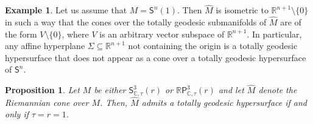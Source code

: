 \documentclass[11pt,a4paper,final]{amsart}
\newcommand{\s}{\mathsf}
\newcommand{\R}{\mathbb{R}}
\newcommand{\C}{\mathbb{C}}
\renewcommand{\hat}{\widehat}
\newtheorem{proposition}[theorem]{Proposition}
\theoremstyle{definition}
\newtheorem{example}[theorem]{Example}
\begin{document}
\begin{example}
\label{ex:unitspherecone}
Let us assume that $M=\s{S}^n(1)$.
	Then $\hat{M}$ is isometric to $\R^{n+1}\setminus \{0\}$ in such a way that the cones over the totally geodesic submanifolds of $\hat{M}$ are of the form $V\setminus \{0\}$, where $V$ is an arbitrary vector subspace of $\R^{n+1}$.
	In particular, any affine hyperplane $\Sigma\subseteq \R^{n+1}$ not containing the origin is a totally geodesic hypersurface that does not appear as a cone over a totally geodesic hypersurface of $\s{S}^n$.
\end{example}
\begin{proposition}
\label{prop:bergercone}
Let $M$ be either $\s{S}^{3}_{\C,\tau}(r)$ or $\R\s{P}^{3}_{\C,\tau}(r)$  and let $\hat M$ denote the Riemannian cone over $M$. Then, $\hat{M}$ admits a totally geodesic hypersurface if and only if $\tau=r=1$.
\end{proposition}
\end{document}

